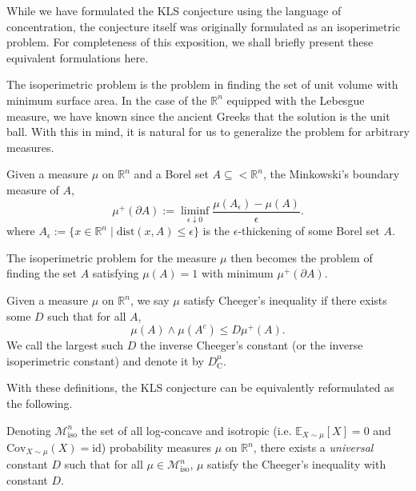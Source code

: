 While we have formulated the KLS conjecture using the language of concentration, the conjecture itself 
was originally formulated as an isoperimetric problem. For completeness of this exposition, we shall 
briefly present these equivalent formulations here.  

The isoperimetric problem is the problem in finding 
the set of unit volume with minimum surface area. In the case of the \(\mathbb{R}^n\) equipped with the 
Lebesgue measure, we have known since the ancient Greeks \cite{iso_hist} that the solution is the unit ball. 
With this in mind, it is natural for us to generalize the problem for arbitrary measures. 

\begin{definition}
  Given a measure \(\mu\) on \(\mathbb{R}^n\) and a Borel set \(A \subseteq <\mathbb{R}^n\), the Minkowski's 
  boundary measure of \(A\), 
  \[\mu^+(\partial A) := \liminf_{\epsilon \downarrow 0} \frac{\mu(A_\epsilon) - \mu(A)}{\epsilon}.\]
  where \(A_\epsilon := \{x \in \mathbb{R}^n \mid \text{dist}(x, A) \le \epsilon\}\) is the 
  \(\epsilon\)-thickening of some Borel set \(A\). 
\end{definition}

The isoperimetric problem for the measure \(\mu\) then becomes the problem of finding the set \(A\) 
satisfying \(\mu(A) = 1\) with minimum \(\mu^+(\partial A)\). 

\begin{definition}
  Given a measure \(\mu\) on \(\mathbb{R}^n\), we say \(\mu\) satisfy Cheeger's inequality 
  if there exists some \(D\) such that for all \(A\),
  \[\mu(A) \wedge \mu(A^c) \le D\mu^+(A).\]
  We call the largest such \(D\) the inverse Cheeger's constant (or the inverse isoperimetric constant) and 
  denote it by \(D^\mu_{\text{C}}\).
\end{definition}

With these definitions, the KLS conjecture can be equivalently reformulated as the following.

\begin{conjecture}
  Denoting \(\mathscr{M}^n_{\text{iso}}\) the set of all log-concave and isotropic 
  (i.e. \(\mathbb{E}_{X \sim \mu}[X] = 0\) and \(\text{Cov}_{X \sim \mu}(X) = \text{id}\)) probability measures \(\mu\) on 
  \(\mathbb{R}^n\), there exists a \textit{universal} constant \(D\) such that for all 
  \(\mu \in \mathscr{M}^n_{\text{iso}}\), \(\mu\) satisfy the Cheeger's inequality with constant \(D\).
\end{conjecture}

